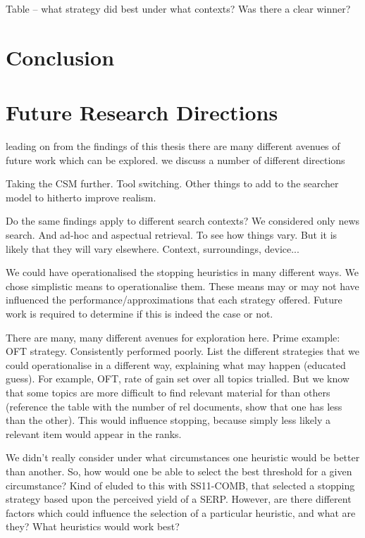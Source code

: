 Table -- what strategy did best under what contexts?
Was there a clear winner?




\section{Conclusion}

\section{Future Research Directions}
leading on from the findings of this thesis there are many different avenues of future work which can be explored.
we discuss a number of different directions 

Taking the CSM further. Tool switching. Other things to add to the searcher model to hitherto improve realism.

Do the same findings apply to different search contexts? We considered only news search. And ad-hoc and aspectual retrieval. To see how things vary. But it is likely that they will vary elsewhere. Context, surroundings, device...


We could have operationalised the stopping heuristics in many different ways. We chose simplistic means to operationalise them. These means may or may not have influenced the performance/approximations that each strategy offered. Future work is required to determine if this is indeed the case or not.

There are many, many different avenues for exploration here. Prime example: OFT strategy. Consistently performed poorly. List the different strategies that we could operationalise in a different way, explaining what may happen (educated guess).
For example, OFT, rate of gain set over all topics trialled. But we know that some topics are more difficult to find relevant material for than others (reference the table with the number of rel documents, show that one has less than the other). This would influence stopping, because simply less likely a relevant item would appear in the ranks.

We didn't really consider under what circumstances one heuristic would be better than another. So, how would one be able to select the best threshold for a given circumstance? Kind of eluded to this with SS11-COMB, that selected a stopping strategy based upon the perceived yield of a SERP. However, are there different factors which could influence the selection of a particular heuristic, and what are they? What heuristics would work best?

